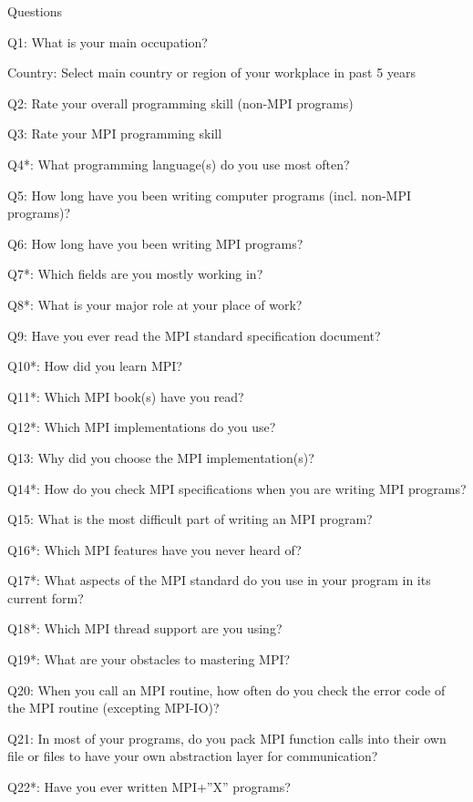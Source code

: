 \documentclass[submit,techrep,noauthor,english]{ipsj}
\begin{document}
\begin{table}
  \caption{Questions}\label{tab:questions}
\begin{description}
\tiny\bf
\item{Q1:} What is your main occupation?
\item{Country:} Select main country or region of your workplace in
  past 5 years 
\item{Q2:} Rate your overall programming skill (non-MPI programs) 
\item{Q3:} Rate your MPI programming skill
\item{Q4*:} What programming language(s) do you use most often?
\item{Q5:} How long have you been writing computer programs
  (incl. non-MPI programs)? 
\item{Q6:} How long have you been writing MPI programs?
\item{Q7*:} Which fields are you mostly working in?
\item{Q8*:} What is your major role at your place of work?
\item{Q9:} Have you ever read the MPI standard specification document?
\item{Q10*:} How did you learn MPI?
\item{Q11*:} Which MPI book(s) have you read?
\item{Q12*:} Which MPI implementations do you use?
\item{Q13:} Why did you choose the MPI implementation(s)?
\item{Q14*:} How do you check MPI specifications when you are writing
  MPI programs? 
\item{Q15:} What is the most difficult part of writing an MPI program?
\item{Q16*:} Which MPI features have you never heard of?
\item{Q17*:} What aspects of the MPI standard do you use in your
  program in its current form? 
\item{Q18*:} Which MPI thread support are you using?
\item{Q19*:} What are your obstacles to mastering MPI?
\item{Q20:} When you call an MPI routine, how often do you check the
  error code of the MPI routine  (excepting MPI-IO)? 
\item{Q21:} In most of your programs, do you pack MPI function calls
  into their own file or files to have your own abstraction layer for
  communication? 
\item{Q22*:} Have you ever written MPI+''X'' programs?

\end{description}
\end{table}
\end{document}
